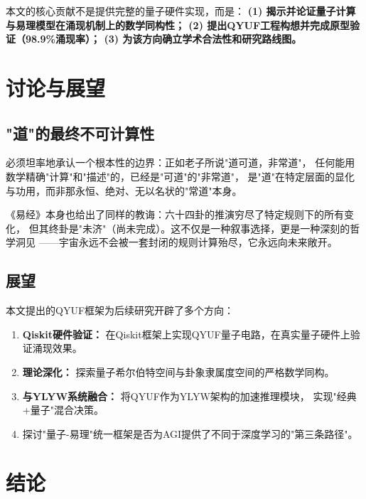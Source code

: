 \documentclass[twocolumn]{article}
\begin{document}
本文的核心贡献不是提供完整的量子硬件实现，而是：
\textbf{(1) 揭示并论证量子计算与易理模型在涌现机制上的数学同构性；
(2) 提出QYUF工程构想并完成原型验证（98.9\%涌现率）；
(3) 为该方向确立学术合法性和研究路线图。}

\section{讨论与展望}

\subsection{"道"的最终不可计算性}

必须坦率地承认一个根本性的边界：正如老子所说"道可道，非常道"，
任何能用数学精确"计算"和"描述"的，已经是"可道"的"非常道"，
是"道"在特定层面的显化与功用，而非那永恒、绝对、无以名状的"常道"本身。

《易经》本身也给出了同样的教诲：六十四卦的推演穷尽了特定规则下的所有变化，
但其终卦是"未济"（尚未完成）。这不仅是一种叙事选择，更是一种深刻的哲学洞见
——宇宙永远不会被一套封闭的规则计算殆尽，它永远向未来敞开。

\subsection{展望}

本文提出的QYUF框架为后续研究开辟了多个方向：

\begin{enumerate}
  \item \textbf{Qiskit硬件验证：} 在Qiskit框架上实现QYUF量子电路，在真实量子硬件上验证涌现效果。
  \item \textbf{理论深化：} 探索量子希尔伯特空间与卦象隶属度空间的严格数学同构。
  \item \textbf{与YLYW系统融合：} 将QYUF作为YLYW架构的加速推理模块，
        实现"经典+量子"混合决策。
  \item 探讨"量子-易理"统一框架是否为AGI提供了不同于深度学习的"第三条路径"。
\end{enumerate}

\section{结论}
\end{document}
